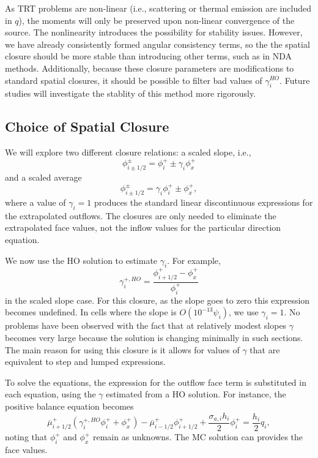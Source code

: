 As TRT problems are non-linear (i.e., scattering or thermal emission are included in
$q$), the moments will only be preserved upon non-linear convergence of the source.  The
nonlinearity introduces the possibility for stability
issues.  However, we have already consistently formed angular consistency terms, so the
the spatial closure should be more stable than introducing other terms, such as
in NDA methods.  Additionally, because these closure
parameters are modifications to standard spatial closures, it should be possible to filter bad
values of $\gamma^{HO}_i$.  Future studies will investigate the stablity of
this method more rigorously.

\subsection{Choice of Spatial Closure}

We will
explore two different closure relations: a scaled slope, i.e.,
\begin{equation}
    \phi_{i\pm1/2}^\pm = \phi_i^+ \pm \gamma_i \phi_x^+
\end{equation}
and a scaled average
\begin{equation}
    \phi_{i\pm1/2}^\pm = \gamma_i \phi_i^+ \pm \phi_x^+,
\end{equation}
where a value of $\gamma_i = 1$ produces the standard linear discontinuous expressions for
the extrapolated outflows.  The 
closures are only needed to eliminate the extrapolated face values, not the inflow values
for the particular direction equation.

We now use the HO solution to estimate $\gamma_i$.  For example, 
\begin{equation}
    \gamma_i^{+,HO} = \frac{\phi_{i+1/2}^+ - \phi_x^+}{\phi_i^+}
\end{equation}
in the scaled slope case.  For this closure, as the slope goes to zero this expression
becomes undefined.  In cells where the slope is $O(10^{-13} \psi_i)$, we use $\gamma_i=1$.
No problems have been observed with the fact that at relatively modest slopes $\gamma$
becomes very large because the solution is changing minimally in such sections. 
The main reason for using this closure is it allows for values of $\gamma$ that are
equivalent to step and lumped expressions.

To solve the equations, the expression for the outflow face term is substituted in each equation, using the
$\gamma$ estimated from a HO solution.
For instance, the positive balance equation becomes
\begin{equation}
    \overline\mu^+_{i+1/2}\left( \gamma_i^{+,HO} \phi_i^+ + \phi_x^+ \right) - \overline\mu^+_{i-1/2}\phi_{i+1/2}^+ +
    \frac{\sigma_{a,i}h_i}{2} \phi_i^+ = \frac{h_i}{2} q_i,
    \label{eqn:clsd_posbal}
\end{equation}
noting that $\phi_i^+$ and $\phi_x^+$ remain as unknowns. The MC solution can provides the
face values.

